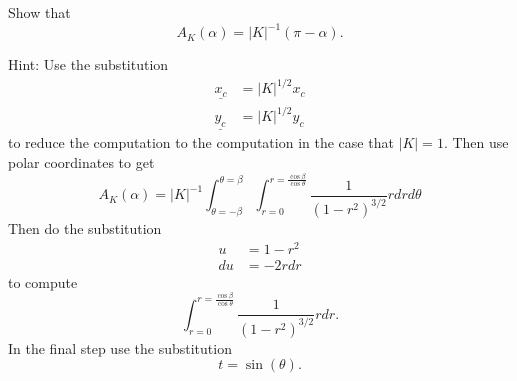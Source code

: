 \documentclass{ximera}
\begin{document}
\begin{exercise}
\label{97}Show that%
\[
A_{K}\left(  \alpha\right)  =\left\vert K\right\vert ^{-1}\left(  \pi
-\alpha\right)  .
\]


Hint: Use the substitution%
\begin{align*}
\underline{x_{c}}  &  =\left\vert K\right\vert ^{1/2}x_{c}\\
\underline{y_{c}}  &  =\left\vert K\right\vert ^{1/2}y_{c}%
\end{align*}
to reduce the computation to the computation in the case that $\left\vert
K\right\vert =1$. Then use polar coordinates to get
\[
A_{K}\left(  \alpha\right)  =\left\vert K\right\vert ^{-1}%
{\displaystyle\int\nolimits_{\theta=-\beta}^{\theta=\beta}}
{\displaystyle\int\nolimits_{r=0}^{r=\frac{\cos \beta}{\cos %
\theta}}}
\frac{1}{\left(  1-r^{2}\right)  ^{3/2}}rdrd\theta
\]
Then do the substitution%
\begin{align*}
u  &  =1-r^{2}\\
du  &  =-2rdr
\end{align*}
to compute
\[%
{\displaystyle\int\nolimits_{r=0}^{r=\frac{\cos \beta}{\cos %
\theta}}}
\frac{1}{\left(  1-r^{2}\right)  ^{3/2}}rdr.
\]
In the final step use the substitution%
\[
t=\sin \left(  \theta\right)  .
\]

\end{exercise}
\end{document}
